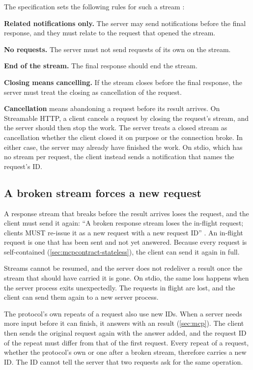 The specification sets the following rules for such a stream \citep{mcp-spec-2026}:
\bi
\item \textbf{Related notifications only.} The server may send notifications before the final
response, and they must relate to the request that opened the stream.
\item \textbf{No requests.} The server must not send requests of its own on the stream.
\item \textbf{End of the stream.} The final response should end the stream.
\item \textbf{Closing means cancelling.} If the stream closes before the final response, the server
must treat the closing as cancellation of the request.
\ei

\textbf{Cancellation} means abandoning a request before its result arrives. On Streamable HTTP, a
client cancels a request by closing the request's stream, and the server should then stop the work.
The server treats a closed stream as cancellation whether the client closed it on purpose or the
connection broke. In either case, the server may already have finished the work. On stdio, which
has no stream per request, the client instead sends a 
notification that names the request's ID.

\subsection{A broken stream forces a new request}
\label{sec:mcpcontract-retry}

A response stream that breaks before the result arrives loses the request, and the client must send
it again: ``A broken response stream loses the in-flight request; clients MUST re-issue it as a new
request with a new request ID'' \citep{mcp-spec-2026}. An in-flight request is one that has been
sent and not yet answered. Because every request is self-contained
(\cref{sec:mcpcontract-stateless}), the client can send it again in full.

Streams cannot be resumed, and the server does not redeliver a result once the stream that should
have carried it is gone. On stdio, the same loss happens when the server process exits
unexpectedly. The requests in flight are lost, and the client can send them again to a new server
process.

The protocol's own repeats of a request also use new IDs. When a server needs more input before it
can finish, it answers with an  result (\cref{sec:mcp}). The client then
sends the original request again with the answer added, and the request ID of the repeat must
differ from that of the first request. Every repeat of a request, whether the protocol's own or one
after a broken stream, therefore carries a new ID. The ID cannot tell the server that two requests
ask for the same operation.

